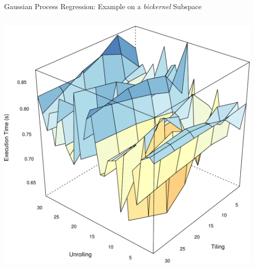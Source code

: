 \documentclass[10pt, compress, aspectratio=169, xcolor={table,usenames,dvipsnames}]{beamer}
\begin{document}
\begin{frame}[label={sec:org69fdb48}]{Gaussian Process Regression: Example on a \emph{bickernel} Subspace}
\begin{columns}
\begin{column}{0.5\columnwidth}
\begin{center}
\includegraphics[width=.95\columnwidth]{../../../img/bicgkernel_averaged_search_space.pdf}
\end{center}

\end{column}
\begin{column}{0.5\columnwidth}
\end{column}
\end{columns}
\end{frame}
\end{document}
